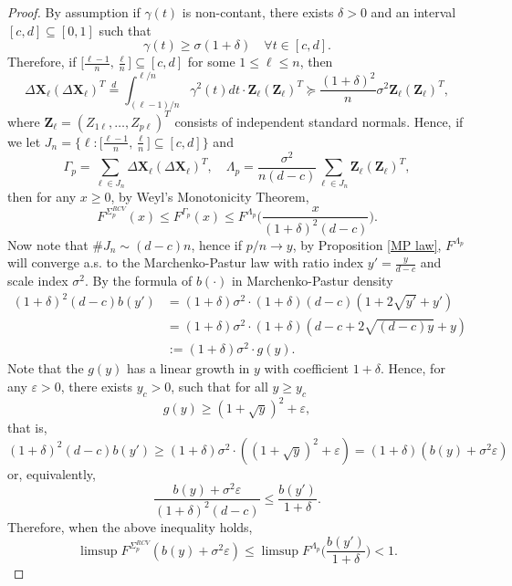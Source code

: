 \documentclass[a4paper,11pt]{article}
\theoremstyle{plain}
\theoremstyle{definition}
\begin{document}
    \begin{proof}
    	By assumption if $\gamma(t)$ is non-contant, there exists $\delta > 0$ and an interval $[c, d] \subseteq [0, 1] $ such that
    	\[ \gamma(t) \geq \sigma(1+\delta) \quad \forall t \in [c, d]. \]
    	Therefore, if $\big[ \frac{\ell - 1}{n}, \frac{\ell}{n} \big] \subseteq [c, d] $ for some $1 \leq \ell \leq n$, then
    	\[ \Delta \mathbf{X}_\ell (\Delta \mathbf{X}_\ell )^T \stackrel{d}{=} \int_{(\ell-1)/n}^{\ell/n} \gamma^2(t) dt \cdot \mathbf{Z}_\ell(\mathbf{Z}_\ell)^T \succeq \frac{(1+\delta)^2}{n} \sigma^2 \mathbf{Z}_\ell(\mathbf{Z}_\ell)^T,  \]
    	where $\mathbf{Z}_\ell = (Z_{1\ell}, \dots , Z_{p\ell})^T$ consists of independent standard normals. Hence, if we let $ J_n = \big\{ \ell: \big[ \frac{\ell - 1}{n}, \frac{\ell}{n} \big] \subseteq [c, d] \big\} $ and
    	\[ \Gamma_p = \sum_{\ell \in J_n} \Delta \mathbf{X}_\ell (\Delta \mathbf{X}_\ell )^T, \quad \Lambda_p = \frac{\sigma^2}{n(d-c)} \sum_{\ell \in J_n} \mathbf{Z}_\ell (\mathbf{Z}_\ell )^T,  \]
    	then for any $x \geq 0$, by Weyl's Monotonicity Theorem,
    	\[
    	F^{\Sigma_p^{RCV}}(x) \leq F^{\Gamma_p}(x) \leq F^{\Lambda_p}\bigg(\frac{x}{(1+\delta)^2(d-c)}\bigg).
    	\]
	    Now note that $\# J_n \sim (d-c)n$, hence if $p/n \rightarrow y$, by Proposition \ref{MP law}, $F^{\Lambda_p}$ will converge a.s. to the Marchenko-Pastur law with ratio index $y'=\frac{y}{d-c}$ and scale index $\sigma^2$.
	    By the formula of $b(\cdot)$ in Marchenko-Pastur density
	    \[
	    \begin{aligned}
	    (1+\delta)^2(d-c)b(y') &=(1+\delta)\sigma^2 \cdot (1+\delta)(d-c)(1+2\sqrt{y'}+y') \\
	    & =(1+\delta)\sigma^2 \cdot (1+\delta)(d-c + 2\sqrt{(d-c)y} + y) \\
	    & := (1+\delta)\sigma^2 \cdot  g(y).
	    \end{aligned}
	    \]
	    Note that the $g(y)$ has a linear growth in $y$ with coefficient $1+\delta$. Hence, for any $\varepsilon > 0$, there exists $y_c > 0$, such that for all $y \geq y_c$
	    \[ g(y) \geq (1+\sqrt{y})^2+\varepsilon,  \]
	    that is,
	    \[ (1+\delta)^2(d-c)b(y') \geq (1+\delta) \sigma^2 \cdot ((1+\sqrt{y})^2+\varepsilon) = (1+\delta)(b(y)+\sigma^2\varepsilon)  \]
	    or, equivalently,
	    \[ \frac{b(y) + \sigma^2\varepsilon}{(1+\delta)^2(d-c)} \leq \frac{b(y')}{1+\delta}. \]
	    Therefore, when the above inequality holds,
	    \[\limsup F^{\Sigma_p^{RCV}}(b(y) + \sigma^2\varepsilon) \leq \limsup F^{\Lambda_p}\bigg(\frac{b(y')}{1+\delta}\bigg) < 1. \]
    \end{proof}
    
\end{document}
